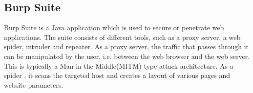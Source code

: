 \subsection{Burp Suite}
Burp Suite is a Java application which is used to secure or penetrate web applications. The suite consists of different tools, such as a proxy server, a web spider, intruder and repeater. As a proxy server, the traffic that passes through it can be manipulated by the user, i.e. between the web browser and the web server. This is typically a Man-in-the-Middle(MITM) type attack architecture. As a spider , it scans the targeted host and creates a layout of various pages and website parameters.
